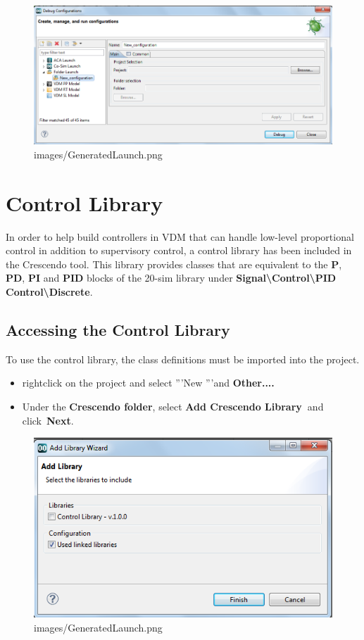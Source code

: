 \documentclass{crescendorepchap}
\begin{document}
\begin{figure}[htbp]
\centering
\includegraphics[width=.6\textwidth]{images/GeneratedLaunch.png}
\caption{images/GeneratedLaunch.png}
\end{figure}

\section{Control Library}

In order to help build controllers in VDM that can handle low-level
proportional control in addition to supervisory control, a control
library has been included in the Crescendo tool. This library provides
classes that are equivalent to the \textbf{P}, \textbf{PD}, \textbf{PI}
and \textbf{PID} blocks of the 20-sim library under
\textbf{Signal\textbackslash{}Control\textbackslash{}PID
Control\textbackslash{}Discrete}.

\subsection{Accessing the Control Library}

To use the control library, the class definitions must be imported into
the project.

\begin{itemize}
\item
  rightclick on the project and select '''New '''and \textbf{Other....}
\item
  Under the \textbf{Crescendo folder}, select \textbf{Add Crescendo
  Library~}and click~\textbf{Next}.
\end{itemize}

\begin{figure}[htbp]
\centering
\includegraphics[width=.6\textwidth]{images/DestecsAddNewLibrary.png}
\caption{images/GeneratedLaunch.png}
\end{figure}
\end{document}
